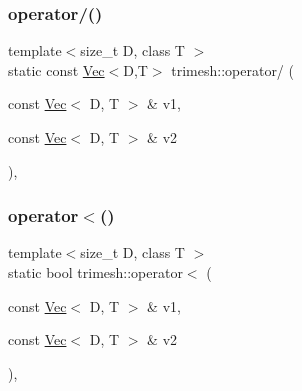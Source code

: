 \mbox{\label{namespacetrimesh_a7fec5a52883c434a9d499c197d21f03d}} 
\subsubsection{\texorpdfstring{operator/()}{operator/()}}
{\footnotesize\ttfamily template$<$size\+\_\+t D, class T $>$ \\
static const \hyperlink{classtrimesh_1_1Vec}{Vec}$<$D,T$>$ trimesh\+::operator/ (\begin{DoxyParamCaption}\item[{const \hyperlink{classtrimesh_1_1Vec}{Vec}$<$ D, T $>$ \&}]{v1,  }\item[{const \hyperlink{classtrimesh_1_1Vec}{Vec}$<$ D, T $>$ \&}]{v2 }\end{DoxyParamCaption})\hspace{0.3cm}{\ttfamily [inline]}, {\ttfamily [static]}}

\mbox{\label{namespacetrimesh_a015e02214c89c581ddc5692c68f7a019}} 
\subsubsection{\texorpdfstring{operator$<$()}{operator<()}}
{\footnotesize\ttfamily template$<$size\+\_\+t D, class T $>$ \\
static bool trimesh\+::operator$<$ (\begin{DoxyParamCaption}\item[{const \hyperlink{classtrimesh_1_1Vec}{Vec}$<$ D, T $>$ \&}]{v1,  }\item[{const \hyperlink{classtrimesh_1_1Vec}{Vec}$<$ D, T $>$ \&}]{v2 }\end{DoxyParamCaption})\hspace{0.3cm}{\ttfamily [inline]}, {\ttfamily [static]}}

\mbox{\label{namespacetrimesh_a9989ea6db6b00c754bf2677f9eac10d4}} 
